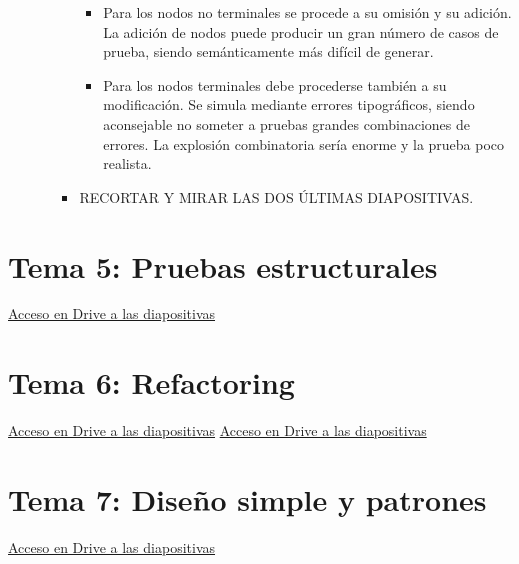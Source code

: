 \documentclass[12pt, twoside, openright]{report} %
\begin{document}
\begin{itemize}
\begin{itemize}
\begin{itemize}
\begin{itemize}
      \item Para los nodos no terminales se procede a su omisión y su
        adición. La adición de nodos puede producir un gran número de
        casos de prueba, siendo semánticamente más difícil de generar.
        
      \item Para los nodos terminales debe procederse también a su
        modificación. Se simula mediante errores tipográficos, siendo
        aconsejable no someter a pruebas grandes combinaciones de
        errores. La explosión combinatoria sería enorme y la prueba poco
        realista.
        
      \end{itemize}
    \item RECORTAR Y MIRAR LAS DOS ÚLTIMAS DIAPOSITIVAS.
      
    \end{itemize}
  \end{itemize}
\end{itemize}

\chapter{Tema 5: Pruebas estructurales}
\href{https://drive.google.com/file/d/1QN40WGKVooiOjw562K46okguqGKIc0_v}{Acceso en Drive a las diapositivas}

\chapter{Tema 6: Refactoring}
\href{https://drive.google.com/file/d/1a-jhAPzLRmHN0jX4g9NcWQMGwmJXDJJF}{Acceso en Drive a las diapositivas}
\href{https://drive.google.com/file/d/137X5u88q_Ozb5H_OHQBAdn421alZKvy-}{Acceso en Drive a las diapositivas}

\chapter{Tema 7: Diseño simple y patrones}
\href{https://drive.google.com/file/d/1zabUADNni-Za7rjMSYpigJMNy7dZsNPn}{Acceso en Drive a las diapositivas}
\end{document}
